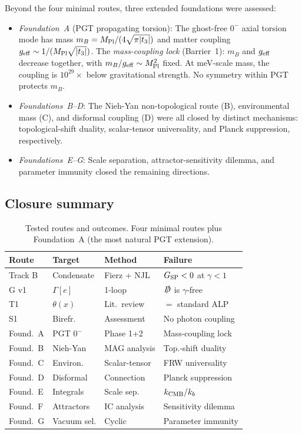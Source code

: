 \documentclass[aps,prd,twocolumn,superscriptaddress,showpacs,preprintnumbers,
  nofootinbib,longbibliography,floatfix]{revtex4-2}
\newcommand{\MPl}{M_{\rm Pl}}
\newcommand{\BI}{\gamma}
\newcommand{\Gsp}{G_{\rm SP}}
\newcommand{\geff}{g_{\rm eff}}
\begin{document}
Beyond the four minimal routes, three extended foundations were assessed:
\begin{itemize}[leftmargin=*]
  \item \textit{Foundation~A} (PGT propagating torsion): The ghost-free
    $0^-$ axial torsion mode has mass $m_B = \MPl/(4\sqrt{\pi|t_3|})$
    and matter coupling $\geff \sim 1/(\MPl\sqrt{|t_3|})$. The
    \textit{mass-coupling lock} (Barrier~1): $m_B$ and $\geff$ decrease
    together, with $m_B/\geff \sim \MPl^2$ fixed. At meV-scale mass,
    the coupling is $10^{29}\times$ below gravitational strength. No
    symmetry within PGT protects $m_B$.
  \item \textit{Foundations~B--D}: The Nieh-Yan non-topological route
    (B), environmental mass (C), and disformal coupling (D) were all
    closed by distinct mechanisms: topological-shift duality, scalar-tensor
    universality, and Planck suppression, respectively.
  \item \textit{Foundations~E--G}: Scale separation, attractor-sensitivity
    dilemma, and parameter immunity closed the remaining directions.
\end{itemize}

\subsection{Closure summary}\label{sec:closure_summary}

\begin{table}[t]
\centering
\caption{\label{tab:closures} Tested routes and outcomes. Four minimal
routes plus Foundation~A (the most natural PGT extension).}
\begin{ruledtabular}
\begin{tabular}{llll}
\textbf{Route} & \textbf{Target} & \textbf{Method} & \textbf{Failure} \\
\hline
Track B & Condensate & Fierz + NJL & $\Gsp < 0$ at $\BI < 1$ \\
G v1 & $\Gamma[e]$ & 1-loop & $\slashed{D}$ is $\BI$-free \\
T1 & $\theta(x)$ & Lit.\ review & $=$ standard ALP \\
S1 & Birefr. & Assessment & No photon coupling \\
Found.\ A & PGT $0^-$ & Phase 1+2 & Mass-coupling lock \\
Found.\ B & Nieh-Yan & MAG analysis & Top.-shift duality \\
Found.\ C & Environ. & Scalar-tensor & FRW universality \\
Found.\ D & Disformal & Connection & Planck suppression \\
Found.\ E & Integrals & Scale sep. & $k_{\rm CMB}/k_b$ \\
Found.\ F & Attractors & IC analysis & Sensitivity dilemma \\
Found.\ G & Vacuum sel. & Cyclic & Parameter immunity \\
\end{tabular}
\end{ruledtabular}
\end{table}
\end{document}
